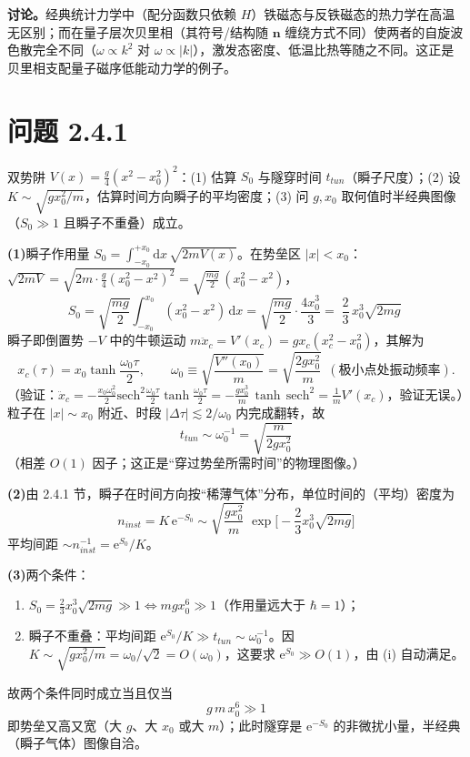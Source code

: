 \textbf{讨论。}经典统计力学中（配分函数只依赖 $H$）铁磁态与反铁磁态的热力学在高温无区别；而在量子层次贝里相（其符号/结构随 $\pmb n$ 缠绕方式不同）使两者的自旋波色散完全不同（$\omega\propto k^2$ 对 $\omega\propto|k|$），激发态密度、低温比热等随之不同。这正是贝里相支配量子磁序低能动力学的例子。

\section*{问题 2.4.1}
\begin{problem}
双势阱 $V(x)=\frac g4(x^2-x_0^2)^2$：(1) 估算 $S_0$ 与隧穿时间 $t_{tun}$（瞬子尺度）；(2) 设 $K\sim\sqrt{gx_0^2/m}$，估算时间方向瞬子的平均密度；(3) 问 $g,x_0$ 取何值时半经典图像（$S_0\gg1$ 且瞬子不重叠）成立。
\end{problem}
\solution
\textbf{(1)}瞬子作用量 $S_0=\int_{-x_0}^{+x_0}\mathrm{d}x\,\sqrt{2mV(x)}$。在势垒区 $|x|<x_0$：$\sqrt{2mV}=\sqrt{2m\cdot\frac g4(x_0^2-x^2)^2}=\sqrt{\frac{mg}2}\,(x_0^2-x^2)$，
\begin{equation*}
S_0=\sqrt{\frac{mg}2}\int_{-x_0}^{x_0}(x_0^2-x^2)\,\mathrm{d}x
=\sqrt{\frac{mg}2}\cdot\frac{4x_0^3}{3}
=\boxed{\;\frac{2}{3}\,x_0^3\sqrt{2mg}\;}
\end{equation*}
瞬子即倒置势 $-V$ 中的牛顿运动 $m\ddot x_c=V'(x_c)=gx_c(x_c^2-x_0^2)$，其解为
\begin{equation*}
x_c(\tau)=x_0\tanh\frac{\omega_0\tau}{2},\qquad
\omega_0\equiv\sqrt{\frac{V''(x_0)}{m}}=\sqrt{\frac{2gx_0^2}{m}}\ \ (\text{极小点处振动频率}).
\end{equation*}
（验证：$\ddot x_c=-\frac{x_0\omega_0^2}2\mathrm{sech}^2\frac{\omega_0\tau}2\tanh\frac{\omega_0\tau}2=-\frac{g x_0^3}m\,\tanh\,\mathrm{sech}^2=\frac{1}{m}V'(x_c)$，验证无误。）粒子在 $|x|\sim x_0$ 附近、时段 $|\Delta\tau|\lesssim2/\omega_0$ 内完成翻转，故
\begin{equation*}
\boxed{\;t_{tun}\sim\omega_0^{-1}=\sqrt{\frac{m}{2gx_0^2}}\;}
\end{equation*}
（相差 $O(1)$ 因子；这正是“穿过势垒所需时间”的物理图像。）

\textbf{(2)}由 2.4.1 节，瞬子在时间方向按“稀薄气体”分布，单位时间的（平均）密度为
\begin{equation*}
\boxed{\;n_{inst}=K\,\mathrm{e}^{-S_0}\sim\sqrt{\frac{g x_0^2}{m}}\;
\exp\Big[-\frac23 x_0^3\sqrt{2mg}\Big]\;}
\end{equation*}
平均间距 $\sim n_{inst}^{-1}=\mathrm{e}^{S_0}/K$。

\textbf{(3)}两个条件：
\begin{enumerate}
\item[(i)] $S_0=\frac23x_0^3\sqrt{2mg}\gg1\iff m g x_0^6\gg1$（作用量远大于 $\hbar=1$）；
\item[(ii)] 瞬子不重叠：平均间距 $\mathrm{e}^{S_0}/K\gg t_{tun}\sim\omega_0^{-1}$。因 $K\sim\sqrt{gx_0^2/m}=\omega_0/\sqrt2=O(\omega_0)$，这要求 $\mathrm{e}^{S_0}\gg O(1)$，由 (i) 自动满足。
\end{enumerate}
故两个条件同时成立当且仅当
\begin{equation*}
\boxed{\;g\,m\,x_0^6\gg1\;}
\end{equation*}
即势垒又高又宽（大 $g$、大 $x_0$ 或大 $m$）；此时隧穿是 $\mathrm{e}^{-S_0}$ 的非微扰小量，半经典（瞬子气体）图像自洽。

